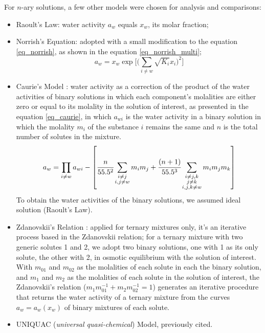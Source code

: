 For $n$-ary solutions, a few other models were chosen for analysis and
comparisons:

\begin{itemize}
	\item Raoult's Law: water activity $a_w$ equals $x_w$,
		its molar fraction;
	\item Norrish's Equation: adopted with a small modification to the equation
		\ref{eq_norrish}, as shown in the equation \ref{eq_norrish_multi};
		\begin{equation}
			\label{eq_norrish_multi}
			a_w = x_w\exp\Big[\Big(\sum_{i \neq w}%
			\sqrt{K_i}x_i\Big)^2\Big]
		\end{equation}
	\item Caurie's Model \cite{caurie1986}: water activity as a correction
		of the product of the water activities of binary solutions
		in which each component's molalities are either zero or equal
		to its molality in the solution of interest, as presented
		in the equation \ref{eq_caurie}, in which $a_{wi}$ is the
		water activity in a binary solution in which the molality $m_i$
		of the substance $i$ remains the same and $n$ is the total number
		of solutes in the mixture.
		\begin{equation}
			\label{eq_caurie}
			a_w = \prod_{i \neq w}a_{wi}-\left[\cfrac{n}%
			{55.5^2}\sum_{\substack{i \neq j \\ i,j \neq w}}%
			m_im_j + \cfrac{(n+1)}{55.5^3}\sum_{%
			\substack{i\neq j,k \\ j \neq k \\  i,j,k \neq w}}%
			m_im_jm_k\right]
		\end{equation}
		To obtain the water activities of the binary solutions,
		we assumed ideal solution (Raoult's Law).
	\item Zdanovskii's Relation \cite{chen1973,sangster1973}:
		applied for ternary mixtures only, it's an iterative process
		based in the Zdanovskii relation; for a ternary mixture with
		two generic solutes 1 and 2, we adopt two binary solutions, one
		with 1 as its only solute, the other with 2, in osmotic equilibrium
		with the solution of interest. With $m_{01}$ and $m_{02}$ as the
		molalities of each solute in each the binary solution, and
		$m_1$ and $m_2$ as the molalities of each solute in the solution
		of interest, the Zdanovskii's relation ($m_1m_{01}^{-1} +
		m_2m_{02}^{-1} = 1$) generates an iterative procedure that
		returns the water activity of a ternary mixture from the
		curves $a_w=a_w(x_w)$ of binary mixtures of each solute.
	\item UNIQUAC (\textit{universal quasi-chemical}) Model, previously
		cited.
\end{itemize}

